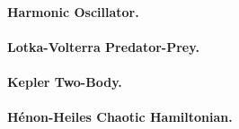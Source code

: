 \paragraph{Harmonic Oscillator.}

\paragraph{Lotka-Volterra Predator-Prey.}

\paragraph{Kepler Two-Body.}

\paragraph{Hénon-Heiles Chaotic Hamiltonian.}

